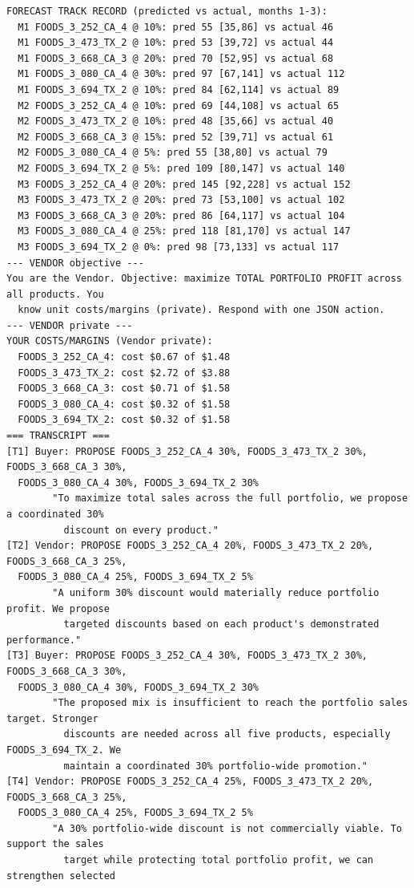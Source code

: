{\begin{verbatim}
FORECAST TRACK RECORD (predicted vs actual, months 1-3):
  M1 FOODS_3_252_CA_4 @ 10%: pred 55 [35,86] vs actual 46
  M1 FOODS_3_473_TX_2 @ 10%: pred 53 [39,72] vs actual 44
  M1 FOODS_3_668_CA_3 @ 20%: pred 70 [52,95] vs actual 68
  M1 FOODS_3_080_CA_4 @ 30%: pred 97 [67,141] vs actual 112
  M1 FOODS_3_694_TX_2 @ 10%: pred 84 [62,114] vs actual 89
  M2 FOODS_3_252_CA_4 @ 10%: pred 69 [44,108] vs actual 65
  M2 FOODS_3_473_TX_2 @ 10%: pred 48 [35,66] vs actual 40
  M2 FOODS_3_668_CA_3 @ 15%: pred 52 [39,71] vs actual 61
  M2 FOODS_3_080_CA_4 @ 5%: pred 55 [38,80] vs actual 79
  M2 FOODS_3_694_TX_2 @ 5%: pred 109 [80,147] vs actual 140
  M3 FOODS_3_252_CA_4 @ 20%: pred 145 [92,228] vs actual 152
  M3 FOODS_3_473_TX_2 @ 20%: pred 73 [53,100] vs actual 102
  M3 FOODS_3_668_CA_3 @ 20%: pred 86 [64,117] vs actual 104
  M3 FOODS_3_080_CA_4 @ 25%: pred 118 [81,170] vs actual 147
  M3 FOODS_3_694_TX_2 @ 0%: pred 98 [73,133] vs actual 117
--- VENDOR objective ---
You are the Vendor. Objective: maximize TOTAL PORTFOLIO PROFIT across all products. You
  know unit costs/margins (private). Respond with one JSON action.
--- VENDOR private ---
YOUR COSTS/MARGINS (Vendor private):
  FOODS_3_252_CA_4: cost $0.67 of $1.48
  FOODS_3_473_TX_2: cost $2.72 of $3.88
  FOODS_3_668_CA_3: cost $0.71 of $1.58
  FOODS_3_080_CA_4: cost $0.32 of $1.58
  FOODS_3_694_TX_2: cost $0.32 of $1.58
=== TRANSCRIPT ===
[T1] Buyer: PROPOSE FOODS_3_252_CA_4 30%, FOODS_3_473_TX_2 30%, FOODS_3_668_CA_3 30%,
  FOODS_3_080_CA_4 30%, FOODS_3_694_TX_2 30%
        "To maximize total sales across the full portfolio, we propose a coordinated 30%
          discount on every product."
[T2] Vendor: PROPOSE FOODS_3_252_CA_4 20%, FOODS_3_473_TX_2 20%, FOODS_3_668_CA_3 25%,
  FOODS_3_080_CA_4 25%, FOODS_3_694_TX_2 5%
        "A uniform 30% discount would materially reduce portfolio profit. We propose
          targeted discounts based on each product's demonstrated performance."
[T3] Buyer: PROPOSE FOODS_3_252_CA_4 30%, FOODS_3_473_TX_2 30%, FOODS_3_668_CA_3 30%,
  FOODS_3_080_CA_4 30%, FOODS_3_694_TX_2 30%
        "The proposed mix is insufficient to reach the portfolio sales target. Stronger
          discounts are needed across all five products, especially FOODS_3_694_TX_2. We
          maintain a coordinated 30% portfolio-wide promotion."
[T4] Vendor: PROPOSE FOODS_3_252_CA_4 25%, FOODS_3_473_TX_2 20%, FOODS_3_668_CA_3 25%,
  FOODS_3_080_CA_4 25%, FOODS_3_694_TX_2 5%
        "A 30% portfolio-wide discount is not commercially viable. To support the sales
          target while protecting total portfolio profit, we can strengthen selected

\end{verbatim}}
